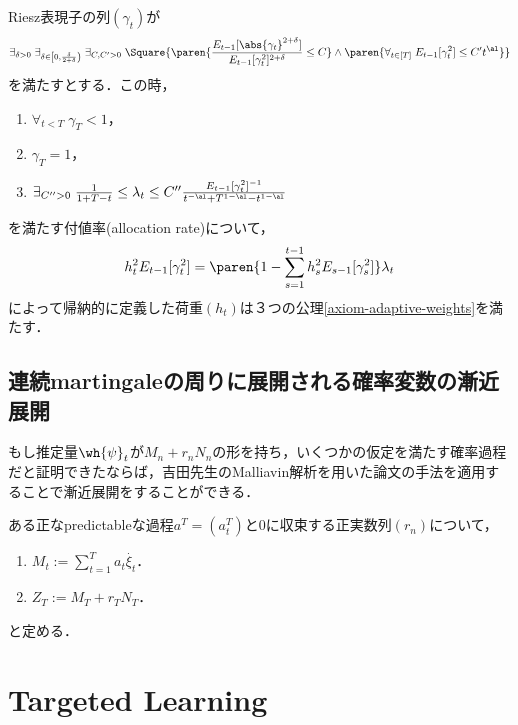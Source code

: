 \documentclass[uplatex,dvipdfmx]{jsreport}
\begin{document}
\begin{theorem}[荷重の構成]
    Riesz表現子の列$(\gamma_t)$が
    \[\exists_{\delta>0}\;\exists_{\delta\in\left[0,\frac{\delta}{2+\delta}\right)}\;\exists_{C,C'>0}\;\Square{\paren{\frac{E_{t-1}[\abs{\gamma_t}^{2+\delta}]}{E_{t-1}[\gamma^2_t]^{2+\delta}}\le C}\land\paren{\forall_{t\in[T]}\;E_{t-1}[\gamma^2_t]\le C't^\al}}\]
    を満たすとする．この時，
    \begin{enumerate}
        \item $\forall_{t<T}\;\gamma_T<1$，
        \item $\gamma_T=1$，
        \item $\exists_{C''>0}\;\frac{1}{1+T-t}\le\lambda_t\le C''\frac{E_{t-1}[\gamma^2_t]^{-1}}{t^{-\al}+T^{1-\al}-t^{1-\al}}$
    \end{enumerate}
    を満たす付値率(allocation rate)について，
    \[h^2_tE_{t-1}[\gamma_t^2]=\paren{1-\sum^{t-1}_{s=1}h_s^2E_{s-1}[\gamma_s^2]}\lambda_t\]
    によって帰納的に定義した荷重$(h_t)$は３つの公理\ref{axiom-adaptive-weights}を満たす．
\end{theorem}

\section{連続martingaleの周りに展開される確率変数の漸近展開}

\begin{tcolorbox}[colframe=ForestGreen, colback=ForestGreen!10!white,breakable,colbacktitle=ForestGreen!40!white,coltitle=black,fonttitle=\bfseries\sffamily,
title=]
    もし推定量$\wh{\psi}_t$が$M_n+r_nN_n$の形を持ち，いくつかの仮定を満たす確率過程だと証明できたならば，吉田先生のMalliavin解析を用いた論文の手法を適用することで漸近展開をすることができる．
\end{tcolorbox}

\begin{definition}
    ある正なpredictableな過程$a^T=(a^T_t)$と$0$に収束する正実数列$(r_n)$について，
    \begin{enumerate}
        \item $M_t:=\sum^T_{t=1}a_t\dot{\xi_t}$．
        \item $Z_T:=M_T+r_TN_T$．
    \end{enumerate}
    と定める．
\end{definition}

\chapter{Targeted Learning}
\end{document}
